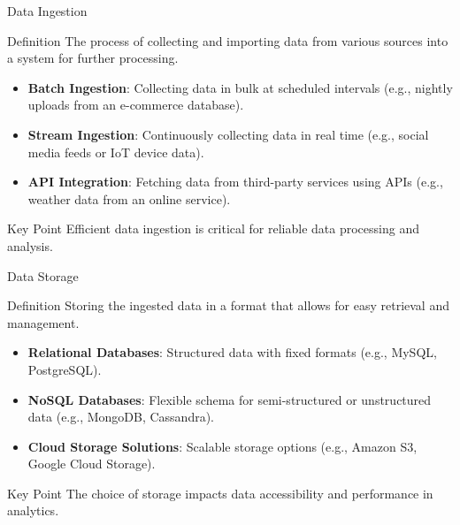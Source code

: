 \documentclass[aspectratio=169]{beamer}
\begin{document}
\begin{frame}[fragile]{Data Ingestion}
    \begin{block}{Definition}
        The process of collecting and importing data from various sources into a system for further processing.
    \end{block}
    \begin{itemize}
        \item \textbf{Batch Ingestion}: Collecting data in bulk at scheduled intervals (e.g., nightly uploads from an e-commerce database).
        \item \textbf{Stream Ingestion}: Continuously collecting data in real time (e.g., social media feeds or IoT device data).
        \item \textbf{API Integration}: Fetching data from third-party services using APIs (e.g., weather data from an online service).
    \end{itemize}
    \begin{block}{Key Point}
        Efficient data ingestion is critical for reliable data processing and analysis.
    \end{block}
\end{frame}

\begin{frame}[fragile]{Data Storage}
    \begin{block}{Definition}
        Storing the ingested data in a format that allows for easy retrieval and management.
    \end{block}
    \begin{itemize}
        \item \textbf{Relational Databases}: Structured data with fixed formats (e.g., MySQL, PostgreSQL).
        \item \textbf{NoSQL Databases}: Flexible schema for semi-structured or unstructured data (e.g., MongoDB, Cassandra).
        \item \textbf{Cloud Storage Solutions}: Scalable storage options (e.g., Amazon S3, Google Cloud Storage).
    \end{itemize}
    \begin{block}{Key Point}
        The choice of storage impacts data accessibility and performance in analytics.
    \end{block}
\end{frame}
\end{document}
